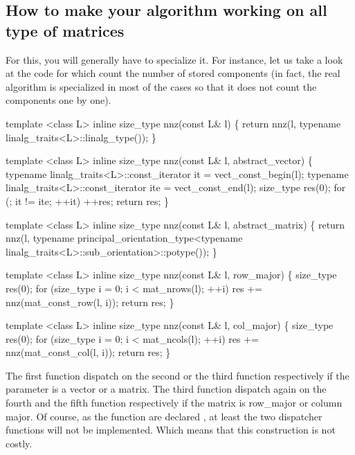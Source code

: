 \documentclass[11pt,a4paper]{article}
\begin{document}
\subsection{How to make your algorithm working on all type of matrices}

For this, you will generally have to specialize it. For instance, let us take a look at the code for  which count the number of stored components (in fact, the real  algorithm is specialized in most of the cases so that it does not count the components one by one).

\begin{cppcode}
  template <class L> inline size_type nnz(const L& l) \{
    return nnz(l, typename linalg_traits<L>::linalg_type());
  \}

  template <class L> inline size_type nnz(const L& l, abstract_vector) \{ 
    typename linalg_traits<L>::const_iterator it = vect_const_begin(l);
    typename linalg_traits<L>::const_iterator ite = vect_const_end(l);
    size_type res(0);
    for (; it != ite; ++it) ++res;
    return res;
  \}

  template <class L> inline size_type nnz(const L& l, abstract_matrix) \{
    return nnz(l,  typename principal_orientation_type<typename
                   linalg_traits<L>::sub_orientation>::potype());
  \}

  template <class L> inline size_type nnz(const L& l, row_major) \{
    size_type res(0);
    for (size_type i = 0; i < mat_nrows(l); ++i)
      res += nnz(mat_const_row(l, i));
    return res;
  \} 

  template <class L> inline size_type nnz(const L& l, col_major) \{
    size_type res(0);
    for (size_type i = 0; i < mat_ncols(l); ++i)
      res += nnz(mat_const_col(l, i));
    return res;
  \}
\end{cppcode}

The first function dispatch on the second or the third function respectively if the parameter is a vector or a matrix. The third function dispatch again on the fourth and the fifth function respectively if the matrix is row_major or column major. Of course, as the function are declared , at least the two dispatcher functions will not be implemented. Which means that this construction is not costly.



\end{document}
